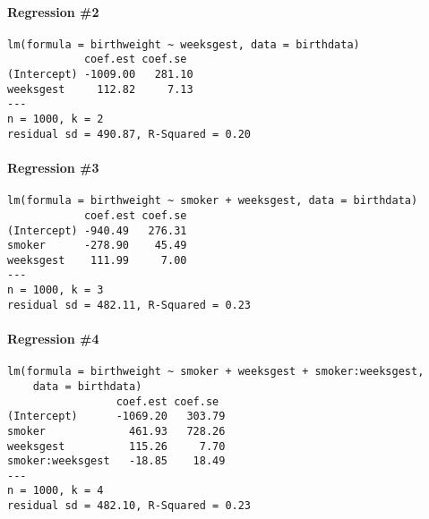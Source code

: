 \documentclass[addpoints,12pt]{exam}
\begin{document}
\begin{questions}
\paragraph{Regression \#2}
\begin{verbatim}
lm(formula = birthweight ~ weeksgest, data = birthdata)
            coef.est coef.se 
(Intercept) -1009.00   281.10
weeksgest     112.82     7.13
---
n = 1000, k = 2
residual sd = 490.87, R-Squared = 0.20
\end{verbatim}

\paragraph{Regression \#3}
\begin{verbatim}
lm(formula = birthweight ~ smoker + weeksgest, data = birthdata)
            coef.est coef.se
(Intercept) -940.49   276.31
smoker      -278.90    45.49
weeksgest    111.99     7.00
---
n = 1000, k = 3
residual sd = 482.11, R-Squared = 0.23
\end{verbatim}

\paragraph{Regression \#4}
\begin{verbatim}
lm(formula = birthweight ~ smoker + weeksgest + smoker:weeksgest, 
    data = birthdata)
                 coef.est coef.se 
(Intercept)      -1069.20   303.79
smoker             461.93   728.26
weeksgest          115.26     7.70
smoker:weeksgest   -18.85    18.49
---
n = 1000, k = 4
residual sd = 482.10, R-Squared = 0.23
\end{verbatim}

\end{questions}
\end{document}
